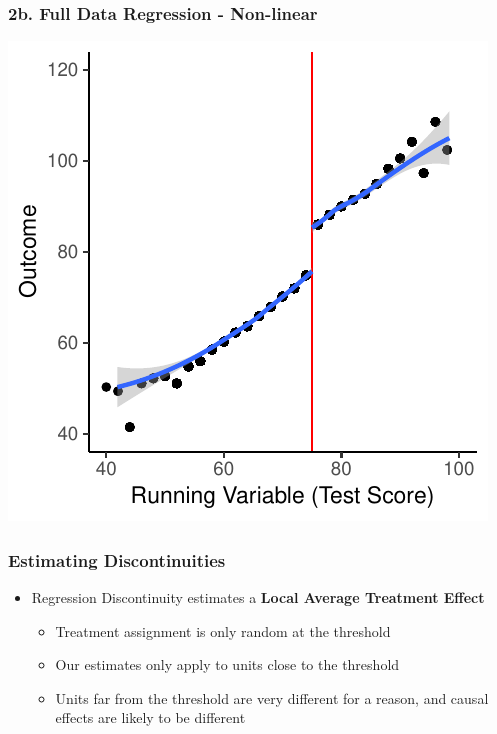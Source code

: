 \documentclass[xcolor=x11names,compress]{beamer}\usepackage[]{graphicx}\usepackage[]{color}
\makeatletter
\def\maxwidth{ %
  \ifdim\Gin@nat@width>\linewidth
    \linewidth
  \else
    \Gin@nat@width
  \fi
}
\newenvironment{knitrout}{}{} %
\renewcommand{\(}{\begin{columns}}
\renewcommand{\)}{\end{columns}}
\newcommand{\<}[1]{\begin{column}{#1}}
\renewcommand{\>}{\end{column}}
\makeatother
\begin{document}
\begin{frame}
\frametitle{2b. Full Data Regression - Non-linear}
\begin{center}
\begin{knitrout}
\color{fgcolor}
\includegraphics[width=\maxwidth]{figure/chart5-1} 

\end{knitrout}
\end{center}
\end{frame}


\begin{frame}
\frametitle{Estimating Discontinuities}
\begin{itemize}
\item Regression Discontinuity estimates a \textbf{Local Average Treatment Effect}
\pause
\begin{itemize}
\item Treatment assignment is only random at the threshold
\pause
\item Our estimates only apply to units close to the threshold
\pause
\item Units far from the threshold are very different for a reason, and causal effects are likely to be different
\end{itemize}
\end{itemize}
\end{frame}
\end{document}
